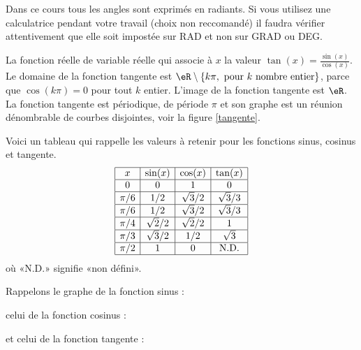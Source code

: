 Dans ce cours tous les angles sont exprimés en radiants. Si vous utilisez une calculatrice pendant votre travail (choix non reccomandé) il faudra vérifier attentivement que elle soit impostée sur RAD et non sur GRAD ou DEG.   

\begin{definition}
  La fonction  réelle de variable réelle qui associe à $x$ la valeur $\tan (x) = \frac{\sin (x)}{\cos (x)}$. Le domaine de la fonction tangente est $\eR\setminus \{ k\pi, \text{ pour } k \text{ nombre entier} \}$, parce que $\cos (k\pi) =0$ pour tout $k$ entier.  L'image de la fonction tangente est $\eR$. La fonction tangente est périodique, de période $\pi$ et son graphe est un réunion dénombrable de courbes disjointes, voir la figure \ref{tangente}. 
\end{definition} 

Voici un tableau qui rappelle les valeurs à retenir pour les fonctions sinus, cosinus et tangente.
\begin{equation*}
    \begin{array}[]{|c|c|c|c|}
      \hline
      x&\sin(x)&\cos(x)&\tan(x)\\
      \hline
      0&0&1&0\\
      \hline
      \pi/6&1/2&\sqrt{3}/2&\sqrt{3}/3\\
      \hline
      \pi/6&1/2&\sqrt{3}/2&\sqrt{3}/3\\
      \hline
      \pi/4&\sqrt{2}/2&\sqrt{2}/2&1\\
      \hline
      \pi/3&\sqrt{3}/2&1/2&\sqrt{3}\\
      \hline
      \pi/2&1&0&\text{N.D.}\\
      \hline
    \end{array}
\end{equation*}
où «N.D.»  signifie «non défini».

Rappelons le graphe de la fonction sinus :
\begin{center}
   
\end{center}
celui de la fonction cosinus :
\begin{center}
   
\end{center}
et celui de la fonction tangente :
\begin{center}\label{tangente}
   
\end{center}

